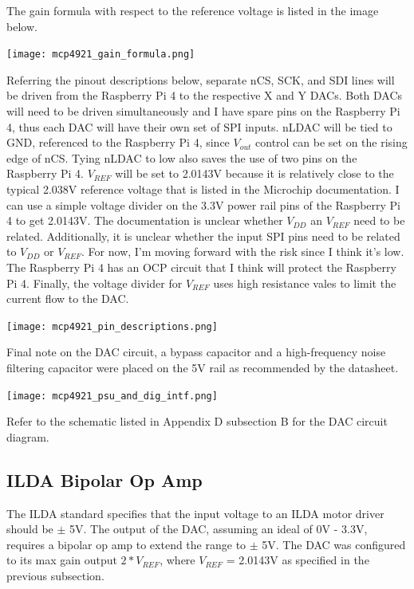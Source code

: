\documentclass[journal]{IEEEtran}
\begin{document}
    The gain formula with respect to the reference voltage is listed in the image below. \newline

    \texttt{[image: mcp4921\_gain\_formula.png]}

    Referring the pinout descriptions below, separate nCS, SCK, and SDI lines will be driven from the Raspberry Pi 4 to the respective X and Y DACs.
    Both DACs will need to be driven simultaneously and I have spare pins on the Raspberry Pi 4, thus each DAC will have their own set of SPI inputs.
    nLDAC will be tied to GND, referenced to the Raspberry Pi 4, since $V_{out}$ control can be set on the rising edge of nCS.
    Tying nLDAC to low also saves the use of two pins on the Raspberry Pi 4.
    $V_{REF}$ will be set to 2.0143V because it is relatively close to the typical 2.038V reference voltage that is listed in the Microchip documentation.
    I can use a simple voltage divider on the 3.3V power rail pins of the Raspberry Pi 4 to get 2.0143V.
    The documentation is unclear whether $V_{DD}$ an $V_{REF}$ need to be related.
    Additionally, it is unclear whether the input SPI pins need to be related to $V_{DD}$ or $V_{REF}$.
    For now, I'm moving forward with the risk since I think it's low.
    The Raspberry Pi 4 has an OCP circuit that I think will protect the Raspberry Pi 4.
    Finally, the voltage divider for $V_{REF}$ uses high resistance vales to limit the current flow to the DAC. \newline

    \texttt{[image: mcp4921\_pin\_descriptions.png]}

    Final note on the DAC circuit, a bypass capacitor and a high-frequency noise filtering capacitor were placed on the 5V rail as recommended by the datasheet. \newline

    \texttt{[image: mcp4921\_psu\_and\_dig\_intf.png]}

    Refer to the schematic listed in Appendix D subsection B for the DAC circuit diagram.
    
    \subsection{ILDA Bipolar Op Amp}

    The ILDA standard specifies that the input voltage to an ILDA motor driver should be $\pm$ 5V.
    The output of the DAC, assuming an ideal of 0V - 3.3V, requires a bipolar op amp to extend the range to $\pm$ 5V.
    The DAC was configured to its max gain output $2 * V_{REF}$, where $V_{REF}$ = 2.0143V as specified in the previous subsection.
    
\end{document}
